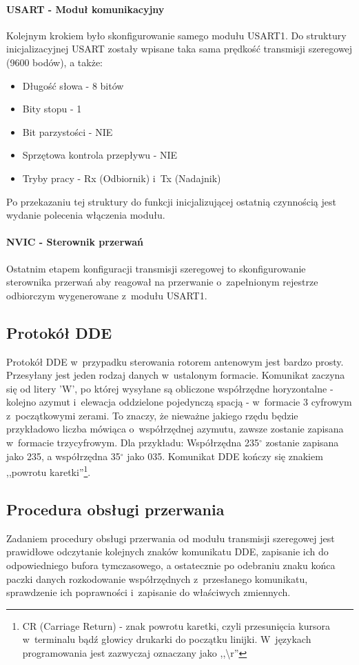 \documentclass[eng,oneside]{mgr}
\begin{document}
				\paragraph{USART - Moduł komunikacyjny}
				Kolejnym krokiem było skonfigurowanie samego modułu USART1. Do struktury inicjalizacyjnej USART zostały wpisane taka sama prędkość transmisji szeregowej (9600 bodów), a także:
				\begin{itemize}
					\item Długość słowa - 8 bitów
					\item Bity stopu - 1
					\item Bit parzystości - NIE
					\item Sprzętowa kontrola przepływu - NIE
					\item Tryby pracy - Rx (Odbiornik) i~Tx (Nadajnik)
				\end{itemize}
				Po przekazaniu tej struktury do funkcji inicjalizującej ostatnią czynnością jest wydanie polecenia włączenia modułu.

				\paragraph{NVIC - Sterownik przerwań}
				Ostatnim etapem konfiguracji transmisji szeregowej to skonfigurowanie sterownika przerwań aby reagował na przerwanie o~zapełnionym rejestrze odbiorczym wygenerowane z~modułu USART1.

			\subsection{Protokół DDE}
			Protokół DDE w~przypadku sterowania rotorem antenowym jest bardzo prosty. Przesyłany jest jeden rodzaj danych w~ustalonym formacie. Komunikat zaczyna się od litery 'W', po której wysyłane są obliczone współrzędne horyzontalne - kolejno azymut i~elewacja oddzielone pojedynczą spacją - w~formacie 3 cyfrowym z~początkowymi zerami. To znaczy, że nieważne jakiego rzędu będzie przykładowo liczba mówiąca o~współrzędnej azymutu, zawsze zostanie zapisana w~formacie trzycyfrowym. Dla przykładu: Współrzędna 235$^{\circ}$ zostanie zapisana jako 235, a współrzędna 35$^{\circ}$ jako 035. Komunikat DDE kończy się znakiem ,,powrotu karetki''\footnote{CR (Carriage Return) - znak powrotu karetki, czyli przesunięcia kursora w~terminalu bądź głowicy drukarki do początku linijki. W~językach programowania jest zazwyczaj oznaczany jako ,,\textbackslash r''}.

			\subsection{Procedura obsługi przerwania}
			\label{ssec:usart_irq_handle}
			Zadaniem procedury obsługi przerwania od modułu transmisji szeregowej jest prawidłowe odczytanie kolejnych znaków komunikatu DDE, zapisanie ich do odpowiedniego bufora tymczasowego, a ostatecznie po odebraniu znaku końca paczki danych rozkodowanie współrzędnych z~przesłanego komunikatu, sprawdzenie ich poprawności i~zapisanie do właściwych zmiennych. 
\end{document}
